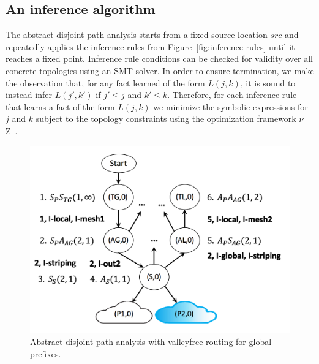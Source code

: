 \documentclass[numbers, 10pt, preprint]{sigplanconf}
\begin{document}
\subsection{An inference algorithm}

The abstract disjoint path analysis starts from a fixed source location $src$ and repeatedly applies the inference rules from Figure~\ref{fig:inference-rules} until it reaches a fixed point. Inference rule conditions can be checked for validity over all concrete topologies using an SMT solver. In order to ensure termination, we make the observation that, for any fact learned of the form $L(j,k)$, it is sound to instead infer $L(j',k')$ if $j' \leq j$ and $k' \leq k$. Therefore, for each inference rule that learns a fact of the form $L(j,k)$ we minimize the symbolic expressions for $j$ and $k$ subject to the topology constraints using the optimization framework $\nu$Z~\cite{z3opt}.

\begin{figure}
  \begin{center}
    \includegraphics[width=\columnwidth]{figures/analysis}
  \end{center}
  \caption{Abstract disjoint path analysis with valleyfree routing for global prefixes. \label{fig:compilation-times}}
  \label{fig:example-inference}
  \vspace{-1em}
\end{figure}
\end{document}
